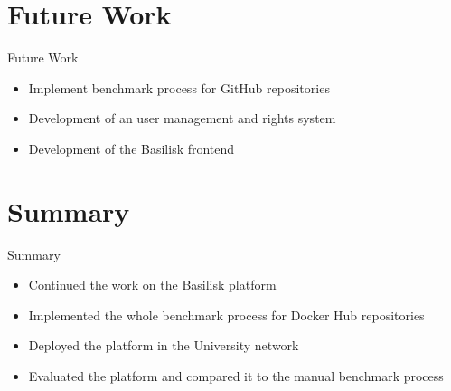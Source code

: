 \section{Future Work}
\begin{frame}{Future Work}
	\begin{itemize}
		\item Implement benchmark process for GitHub repositories
		\item Development of an user management and rights system
		
		\item Development of the Basilisk frontend
	\end{itemize}
\end{frame}

\section{Summary}
\begin{frame}{Summary}
	\begin{itemize}
		\item Continued the work on the Basilisk platform
		\item Implemented the whole benchmark process for Docker Hub repositories
		\item Deployed the platform in the University network
		\item Evaluated the platform and compared it to the manual benchmark process 
	\end{itemize}
\end{frame}